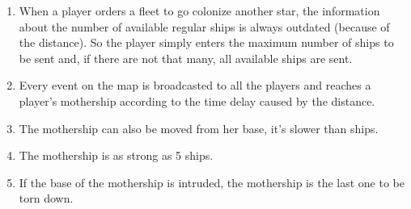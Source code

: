 \begin{enumerate}
	\item When a player orders a fleet to go colonize another star, the information about the number of available regular ships is always outdated (because of the distance). So the player simply enters the maximum number of ships to be sent and, if there are not that many, all available ships are sent.
	\item Every event on the map is broadcasted to all the players and reaches a player's mothership according to the time delay caused by the distance.
	\item The mothership can also be moved from her base, it's slower than ships.
	\item The mothership is as strong as 5 ships.
	\item If the base of the mothership is intruded, the mothership is the last one to be torn down.
\end{enumerate}